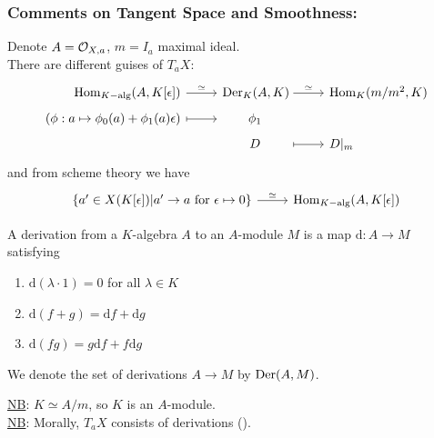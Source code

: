 \documentclass[a4paper,11pt]{article}
\begin{document}
			{\color{gray}\subsubsection*{Comments on Tangent Space and Smoothness:}

				Denote $A=\mathcal{O}_{X,a}$, $m=I_a$ maximal ideal.
				\\

				\noindent There are different guises of $T_aX$:
				\begin{equation*}
					\begin{tikzcd}[row sep=.1cm,
						/tikz/column 1/.append style={nodes={anchor=base east}},
						/tikz/column 2/.append style={nodes={text width=width("$Derk(AlK)$"), text centered}},
						/tikz/column 3/.append style={nodes={anchor=base west}}]
						\Hom_{K-\text{alg}}(A,K[\epsilon])\ar[r,"\simeq"] & \der_K(A,K)\ar[r,"\simeq"] & \Hom_K(m/m^2,K)\\
						(\phi:a\mapsto\phi_0(a)+\phi_1(a)\epsilon)\ar[r,mapsto] & \phi_1 &\\
						& D\ar[r,mapsto] & D|_m
					\end{tikzcd}
				\end{equation*}
				and from scheme theory we have
				\begin{equation*}
					\begin{tikzcd}
						\{a^\prime\in X(K[\epsilon])|a^\prime\rightarrow a\text{ for }\epsilon\mapsto 0\}\ar[r,"\simeq"] & \Hom_{K-\text{alg}}(A,K[\epsilon])
					\end{tikzcd}
				\end{equation*}
				
				\begin{defi}
					A derivation from a $K$-algebra $A$ to an $A$-module $M$ is a map $\mathrm{d}:A\rightarrow M$ satisfying
					\begin{enumerate}
						\item $\mathrm{d}(\lambda\cdot 1)=0$ for all $\lambda\in K$
						\item $\mathrm{d}(f+g)=\mathrm{d}f+\mathrm{d}g$
						\item $\mathrm{d}(fg)=g\mathrm{d}f+f\mathrm{d}g$
					\end{enumerate}
					We denote the set of derivations $A\rightarrow M$ by $\operatorname{Der}(A,M)$.
				\end{defi}

				\noindent\underline{NB}: $K\simeq A/m$, so $K$ is an $A$-module.
				\\

				\noindent\underline{NB}: Morally, $T_aX$ consists of derivations ().
				\\

}
\end{document}
